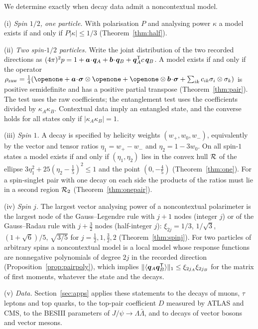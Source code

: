 We determine exactly when decay data admit a noncontextual model.

(i) \emph{Spin $1/2$, one particle.} With polarisation $P$ and analysing power $\kappa$ a model exists if and only if $P|\kappa|\le 1/3$ (Theorem~\ref{thm:half}).

(ii) \emph{Two spin-$1/2$ particles.} Write the joint distribution of the two recorded directions as $(4\pi)^2p=1+\bm{a}\!\cdot\!\bm{q}_A+\bm{b}\!\cdot\!\bm{q}_B+\bm{q}_A^{\mathsf{T}}c\,\bm{q}_B$. A model exists if and only if the operator $\rhoraw=\tfrac14(\openone+\ba\!\cdot\!\bsig\otimes\openone+\openone\otimes\bb\!\cdot\!\bsig+\sum_{ik}c_{ik}\sigma_i\otimes\sigma_k)$ is positive semidefinite and has a positive partial transpose (Theorem~\ref{thm:pair}). The test uses the raw coefficients; the entanglement test uses the coefficients divided by $\kappa_A\kappa_B$. Contextual data imply an entangled state, and the converse holds for all states only if $|\kappa_A\kappa_B|=1$.

(iii) \emph{Spin $1$.} A decay is specified by helicity weights $(w_+,w_0,w_-)$, equivalently by the vector and tensor ratios $\eta_1=w_+-w_-$ and $\eta_2=1-3w_0$. On all spin-$1$ states a model exists if and only if $(\eta_1,\eta_2)$ lies in the convex hull $\mathcal{R}$ of the ellipse $3\eta_1^2+25(\eta_2-\tfrac15)^2\le1$ and the point $(0,-\tfrac45)$ (Theorem~\ref{thm:one}). For a spin-singlet pair with one decay on each side the products of the ratios must lie in a second region $\mathcal{R}_2$ (Theorem~\ref{thm:onepair}).

(iv) \emph{Spin $j$.} The largest vector analysing power of a noncontextual polarimeter is the largest node of the Gauss--Legendre rule with $j+1$ nodes (integer $j$) or of the Gauss--Radau rule with $j+\tfrac32$ nodes (half-integer $j$): $\xi_{2j}=1/3$, $1/\sqrt3$, $(1+\sqrt6)/5$, $\sqrt{3/5}$ for $j=\tfrac12,1,\tfrac32,2$ (Theorem~\ref{thm:spinj}). For two particles of arbitrary spins a noncontextual model is a local model whose response functions are nonnegative polynomials of degree $2j$ in the recorded direction (Proposition~\ref{prop:pairpoly}), which implies $\|\langle\bm{q}_A\bm{q}_B^{\mathsf{T}}\rangle\|_1\le\xi_{2j_A}\xi_{2j_B}$ for the matrix of first moments, whatever the state and the decays.

(v) \emph{Data.} Section~\ref{sec:apps} applies these statements to the decays of muons, $\tau$ leptons and top quarks, to the top-pair coefficient $D$ measured by ATLAS and CMS, to the BESIII parameters of $J/\psi\to\Lambda\bar\Lambda$, and to decays of vector bosons and vector mesons.

